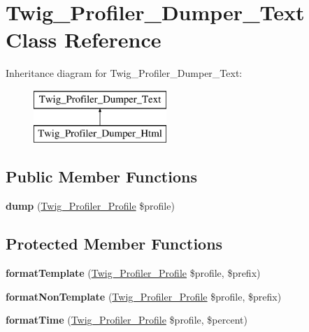 \hypertarget{class_twig___profiler___dumper___text}{}\section{Twig\+\_\+\+Profiler\+\_\+\+Dumper\+\_\+\+Text Class Reference}
\label{class_twig___profiler___dumper___text}
Inheritance diagram for Twig\+\_\+\+Profiler\+\_\+\+Dumper\+\_\+\+Text\+:\begin{figure}[H]
\begin{center}
\leavevmode
\includegraphics[height=2.000000cm]{class_twig___profiler___dumper___text}
\end{center}
\end{figure}
\subsection*{Public Member Functions}
\begin{DoxyCompactItemize}
\item 
\hypertarget{class_twig___profiler___dumper___text_a6c5847be5fe44203b20ccca8ce59c05b}{}{\bfseries dump} (\hyperlink{class_twig___profiler___profile}{Twig\+\_\+\+Profiler\+\_\+\+Profile} \$profile)\label{class_twig___profiler___dumper___text_a6c5847be5fe44203b20ccca8ce59c05b}

\end{DoxyCompactItemize}
\subsection*{Protected Member Functions}
\begin{DoxyCompactItemize}
\item 
\hypertarget{class_twig___profiler___dumper___text_a02c170148566e209ced5cdf1b743418b}{}{\bfseries format\+Template} (\hyperlink{class_twig___profiler___profile}{Twig\+\_\+\+Profiler\+\_\+\+Profile} \$profile, \$prefix)\label{class_twig___profiler___dumper___text_a02c170148566e209ced5cdf1b743418b}

\item 
\hypertarget{class_twig___profiler___dumper___text_aa1161e3f32546d26391304d787264ddd}{}{\bfseries format\+Non\+Template} (\hyperlink{class_twig___profiler___profile}{Twig\+\_\+\+Profiler\+\_\+\+Profile} \$profile, \$prefix)\label{class_twig___profiler___dumper___text_aa1161e3f32546d26391304d787264ddd}

\item 
\hypertarget{class_twig___profiler___dumper___text_ae1ea1c70a40a31c730fd4cc049f31425}{}{\bfseries format\+Time} (\hyperlink{class_twig___profiler___profile}{Twig\+\_\+\+Profiler\+\_\+\+Profile} \$profile, \$percent)\label{class_twig___profiler___dumper___text_ae1ea1c70a40a31c730fd4cc049f31425}

\end{DoxyCompactItemize}


